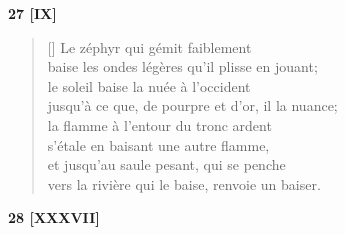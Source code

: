 \documentclass[a4paper,12pt]{book}
\begin{document}
\bigskip

\begin{center}
  \textbf{27 [IX]}
\end{center}

\settowidth{\versewidth}{jusqu'à ce que de pourpre et d'or il la nuance;}

\begin{verse}[\versewidth]
  Le zéphyr qui gémit faiblement \\
  baise les ondes légères qu'il plisse en jouant; \\
  le soleil baise la nuée à l'occident \\
  jusqu'à ce que, de pourpre et d'or, il la nuance; \\
  la flamme à l'entour du tronc ardent \\
  s'étale en baisant une autre flamme, \\
  et jusqu'au saule pesant, qui se penche \\
  vers la rivière qui le baise, renvoie un baiser.
\end{verse}

\bigskip

\begin{center}
  \textbf{28 [XXXVII]}
\end{center}

\settowidth{\versewidth}{je porte le fer avec lequel ta main ouvrit}
\end{document}
